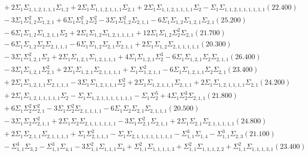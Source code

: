 \documentclass[12pt]{article}
\begin{document}
\begin{landscape}
\begin{align*}
		&\quad\quad +2\Sigma_{1}\Sigma_{1,1,2,1,1,1}\Sigma_{1,2}+2\Sigma_{1}\Sigma_{1,1,2,1,1,1}\Sigma_{2,1}+2\Sigma_{1}\Sigma_{1,1,2,1,1,1,1}\Sigma_{2}-\Sigma_{1}\Sigma_{1,1,2,1,1,1,1,1,1}(22.400) \\ 
		&\quad\quad -3\Sigma_{1}\Sigma_{1,2}^{2}\Sigma_{1,2,1}+6\Sigma_{1}\Sigma_{1,2}^{2}\Sigma_{2}^{2}-3\Sigma_{1}\Sigma_{1,2}^{2}\Sigma_{2,1,1}-6\Sigma_{1}\Sigma_{1,2}\Sigma_{1,2,1}\Sigma_{2,1}(25.200) \\ 
		&\quad\quad -6\Sigma_{1}\Sigma_{1,2}\Sigma_{1,2,1,1}\Sigma_{2}+2\Sigma_{1}\Sigma_{1,2}\Sigma_{1,2,1,1,1,1}+12\Sigma_{1}\Sigma_{1,2}\Sigma_{2}^{2}\Sigma_{2,1}(21.700) \\ 
		&\quad\quad -6\Sigma_{1}\Sigma_{1,2}\Sigma_{2}\Sigma_{2,1,1,1}-6\Sigma_{1}\Sigma_{1,2}\Sigma_{2,1}\Sigma_{2,1,1}+2\Sigma_{1}\Sigma_{1,2}\Sigma_{2,1,1,1,1,1}(20.300) \\ 
		&\quad\quad -3\Sigma_{1}\Sigma_{1,2,1}^{2}\Sigma_{2}+2\Sigma_{1}\Sigma_{1,2,1}\Sigma_{1,2,1,1,1}+4\Sigma_{1}\Sigma_{1,2,1}\Sigma_{2}^{3}-6\Sigma_{1}\Sigma_{1,2,1}\Sigma_{2}\Sigma_{2,1,1}(26.400) \\ 
		&\quad\quad -3\Sigma_{1}\Sigma_{1,2,1}\Sigma_{2,1}^{2}+2\Sigma_{1}\Sigma_{1,2,1}\Sigma_{2,1,1,1,1}+\Sigma_{1}\Sigma_{1,2,1,1}^{2}-6\Sigma_{1}\Sigma_{1,2,1,1}\Sigma_{2}\Sigma_{2,1}(23.400) \\ 
		&\quad\quad +2\Sigma_{1}\Sigma_{1,2,1,1}\Sigma_{2,1,1,1}-3\Sigma_{1}\Sigma_{1,2,1,1,1}\Sigma_{2}^{2}+2\Sigma_{1}\Sigma_{1,2,1,1,1}\Sigma_{2,1,1}+2\Sigma_{1}\Sigma_{1,2,1,1,1,1}\Sigma_{2,1}(24.200) \\ 
		&\quad\quad +2\Sigma_{1}\Sigma_{1,2,1,1,1,1,1}\Sigma_{2}-\Sigma_{1}\Sigma_{1,2,1,1,1,1,1,1,1}-\Sigma_{1}\Sigma_{2}^{5}+4\Sigma_{1}\Sigma_{2}^{3}\Sigma_{2,1,1}(21.800) \\ 
		&\quad\quad +6\Sigma_{1}\Sigma_{2}^{2}\Sigma_{2,1}^{2}-3\Sigma_{1}\Sigma_{2}^{2}\Sigma_{2,1,1,1,1}-6\Sigma_{1}\Sigma_{2}\Sigma_{2,1}\Sigma_{2,1,1,1}(20.500) \\ 
		&\quad\quad -3\Sigma_{1}\Sigma_{2}\Sigma_{2,1,1}^{2}+2\Sigma_{1}\Sigma_{2}\Sigma_{2,1,1,1,1,1,1}-3\Sigma_{1}\Sigma_{2,1}^{2}\Sigma_{2,1,1}+2\Sigma_{1}\Sigma_{2,1}\Sigma_{2,1,1,1,1,1}(24.800) \\ 
		&\quad\quad +2\Sigma_{1}\Sigma_{2,1,1}\Sigma_{2,1,1,1,1}+\Sigma_{1}\Sigma_{2,1,1,1}^{2}-\Sigma_{1}\Sigma_{2,1,1,1,1,1,1,1,1}-\Sigma_{1,1}^{3}\Sigma_{1,4}-\Sigma_{1,1}^{3}\Sigma_{2,3}(21.100) \\ 
		&\quad\quad -\Sigma_{1,1}^{3}\Sigma_{3,2}-\Sigma_{1,1}^{3}\Sigma_{4,1}-3\Sigma_{1,1}^{2}\Sigma_{1,1,1}\Sigma_{4}+\Sigma_{1,1}^{2}\Sigma_{1,1,1,1,3}+\Sigma_{1,1}^{2}\Sigma_{1,1,1,2,2}+\Sigma_{1,1}^{2}\Sigma_{1,1,1,3,1}(23.400) \\ 

\end{align*}
\end{landscape}
\end{document}
